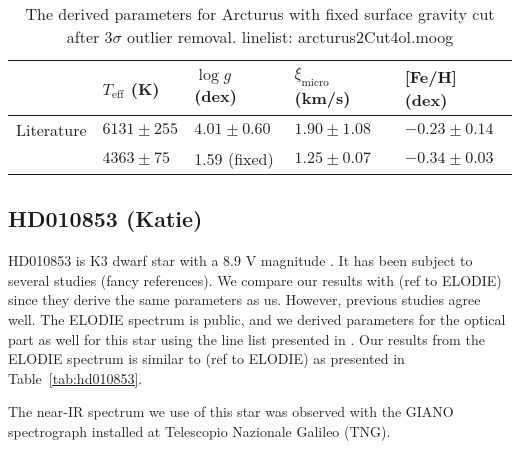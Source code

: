\documentclass{aa}
\begin{document}
\begin{table*}[htb!]
    \caption{The derived parameters for Arcturus with
    fixed surface gravity cut after 3$\sigma$ outlier removal. linelist: arcturus2Cut4ol.moog}
    \label{tab:arcturus}
    \centering
    \begin{tabular}{lllll}
      \hline\hline
                     & $T_\mathrm{eff}$ (K) &  $\log g$ (dex)  &   $\xi_\mathrm{micro}$ (km/s)  & [Fe/H] (dex)      \\
      \hline
        Literature   & $6131 \pm 255$       &  $4.01 \pm 0.60$ &    $1.90 \pm 1.08$              & $-0.23 \pm 0.14$ \\
      \hline
                     & $4363 \pm 75$        &   1.59 (fixed)   &    $1.25 \pm 0.07$              & $-0.34 \pm 0.03$ \\
      \hline
    \end{tabular}
\end{table*}



\subsection{HD010853 (Katie)}
\label{sub:HD010853}
HD010853 is K3 dwarf star with a 8.9 V magnitude \citep{Koen2010}. It has
been subject to several studies (fancy references). We compare our results
with (ref to ELODIE) since they derive the same parameters as us. However,
previous studies agree well. The ELODIE spectrum is public, and we derived
parameters for the optical part as well for this star using the line list
presented in \citet{Sousa2008a}. Our results from the ELODIE spectrum is
similar to (ref to ELODIE) as presented in Table~\ref{tab:hd010853}.

The near-IR spectrum we use of this star was observed with the GIANO
spectrograph installed at Telescopio Nazionale Galileo (TNG).
\end{document}

